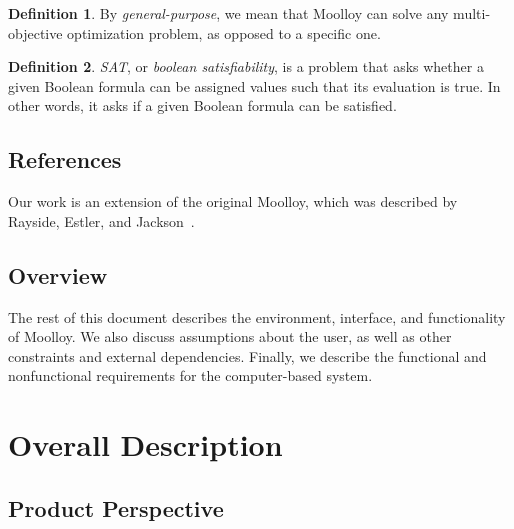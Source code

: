 \documentclass[11pt]{article}
\theoremstyle{definition}
\newtheorem{mydef}{Definition}
\begin{document}
\begin{mydef}
By \textit{general-purpose}, we mean that Moolloy can solve any
multi-objective optimization problem, as opposed to a specific one.
\end{mydef}

\begin{mydef}
\textit{SAT}, or \textit{boolean satisfiability}, is a problem that
asks whether a given Boolean formula can be assigned values such that
its evaluation is true. In other words, it asks if a given Boolean
formula can be satisfied.
\end{mydef}

\subsection{References}

Our work is an extension of the original Moolloy, which was described
by Rayside, Estler, and Jackson~\cite{ref:moolloy}.

\subsection{Overview}

The rest of this document describes the environment, interface, and
functionality of Moolloy. We also discuss assumptions about the user,
as well as other constraints and external dependencies. Finally, we
describe the functional and nonfunctional requirements for the
computer-based system.

\section{Overall Description}

\subsection{Product Perspective}
\end{document}
